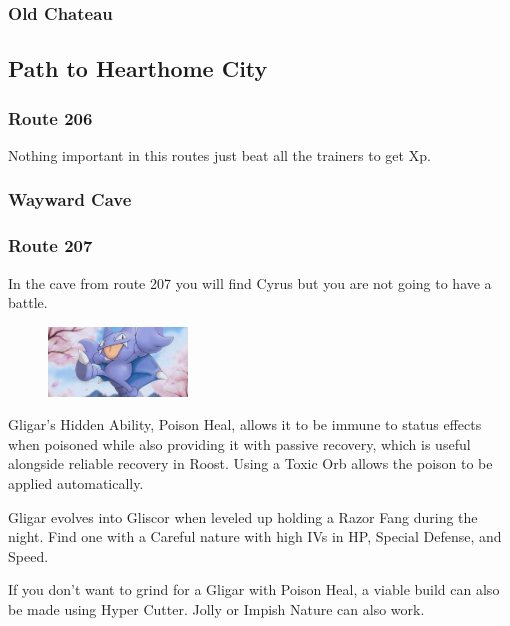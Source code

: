 \documentclass[11pt]{article}
\begin{document}
\subsubsection{Old Chateau}\label{subsubsec:old_chateau}




\subsection{Path to Hearthome City}\label{subsec:path-to-hearthome-city}

\subsubsection{Route 206}\label{subsubsec:route_206}
Nothing important in this routes just beat all the trainers to get Xp.

\subsubsection{Wayward Cave}\label{subsubsec:wayward_cave}



\subsubsection{Route 207}\label{subsubsec:route_207}
In the cave from route 207 you will find Cyrus but you are not going to have a battle.




\begin{mdframed}[style=MyFrame,nobreak=true,frametitle={Pokemon Spotlight: Gligar}]

\begin{figure}
\includegraphics[width=0.33\textwidth]{walkthrough/Sinnoh/spotlight-gligar}
\label{fig:spotlight-gligar}
\end{figure}

Gligar's Hidden Ability, Poison Heal, allows it to be immune to status effects
when poisoned while also providing it with passive recovery, which is useful
alongside reliable recovery in Roost.
Using a Toxic Orb allows the poison to be applied automatically.

Gligar evolves into Gliscor when leveled up holding a Razor Fang during the night.
Find one with a Careful nature with high IVs in HP, Special Defense, and Speed.

If you don't want to grind for a Gligar with Poison Heal, a viable build can
also be made using Hyper Cutter.
Jolly or Impish Nature can also work.

\end{mdframed}
\end{document}
